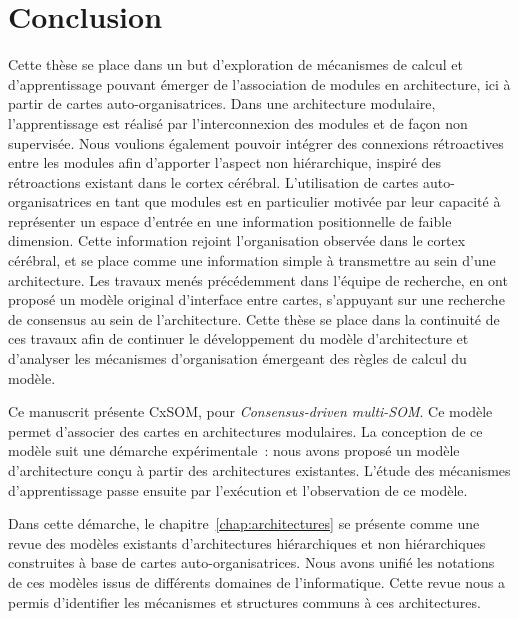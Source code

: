 \chapter*{Conclusion}

Cette thèse se place dans un but d'exploration de mécanismes de calcul et d'apprentissage pouvant émerger de l'association de modules en architecture, ici à partir de cartes auto-organisatrices.
Dans une architecture modulaire, l'apprentissage est réalisé par l'interconnexion des modules et de façon non supervisée. Nous voulions également pouvoir intégrer des connexions rétroactives entre les modules afin d'apporter l'aspect non hiérarchique, inspiré des rétroactions existant dans le cortex cérébral.
L'utilisation de cartes auto-organisatrices en tant que modules est en particulier motivée par leur capacité à représenter un espace d'entrée en une information positionnelle de faible dimension. Cette information rejoint l'organisation observée dans le cortex cérébral, et se place comme une information simple à transmettre au sein d'une architecture.
Les travaux menés précédemment dans l'équipe de recherche, en \cite{menard05,khouzam_2013,baheux_towards_2014} ont proposé un modèle original d'interface entre cartes, s'appuyant sur une recherche de consensus au sein de l'architecture. Cette thèse se place dans la continuité de ces travaux afin de continuer le développement du modèle d'architecture et d'analyser les mécanismes d'organisation émergeant des règles de calcul du modèle. 


Ce manuscrit présente CxSOM, pour \emph{Consensus-driven multi-SOM}. Ce modèle permet d'associer des cartes en architectures modulaires. La conception de ce modèle suit une démarche expérimentale~: nous avons proposé un modèle d'architecture conçu à partir des architectures existantes.
L'étude des mécanismes d'apprentissage passe ensuite par l'exécution et l'observation de ce modèle.

Dans cette démarche, le chapitre~\ref{chap:architectures} se présente comme une revue des modèles existants d'architectures hiérarchiques et non hiérarchiques construites à base de cartes auto-organisatrices. 
Nous avons unifié les notations de ces modèles issus de différents domaines de l'informatique. Cette revue nous a permis d'identifier les mécanismes et structures communs à ces architectures.


